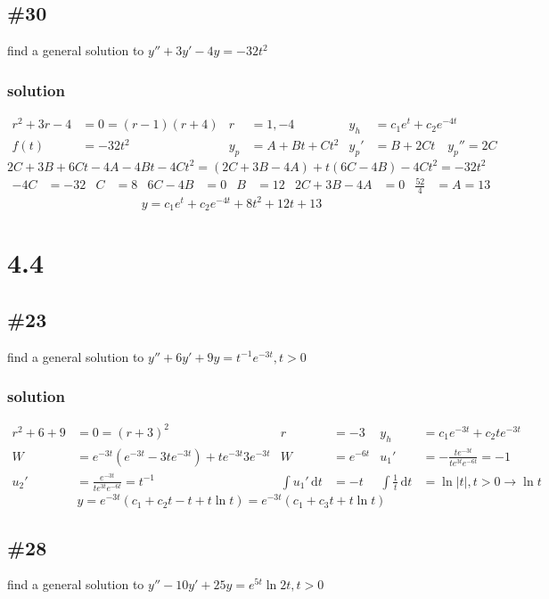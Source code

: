 \documentclass{article}
\newcommand{\abs}[1]{\left\lvert #1 \right\rvert}
\begin{document}
\subsection*{\#30}
find a general solution to $y''+3y'-4y=-32t^2$
\subsubsection*{solution}
\begin{align*}
	r^2+3r-4&=0=(r-1)(r+4) & r&=1,-4 & y_h&=c_1e^t+c_2e^{-4t}\\
	f(t)&=-32t^2 & y_p&=A+Bt+Ct^2 & {y_p}'&=B+2Ct \quad {y_p}''=2C
\end{align*}
\[2C+3B+6Ct-4A-4Bt-4Ct^2=(2C+3B-4A)+t(6C-4B)-4Ct^2=-32t^2\]
\begin{align*}
	-4C&=-32 & C&=8 & 6C-4B&=0 & B&=12 & 2C+3B-4A&=0 & \frac{52}{4}&=A=13
\end{align*}
\[y=c_1e^t+c_2e^{-4t}+8t^2+12t+13\]
\section*{4.4}

\subsection*{\#23}
find a general solution to $y''+6y'+9y=t^{-1}e^{-3t},t>0$
\subsubsection*{solution}
\begin{align*}
	r^2+6+9&=0=(r+3)^2 & r&=-3 & y_h&=c_1e^{-3t}+c_2te^{-3t}\\
	W&=e^{-3t}(e^{-3t}-3te^{-3t})+te^{-3t}3e^{-3t} & W&=e^{-6t} & {u_1}'&=-\frac{te^{-3t}}{te^{3t}e^{-6t}}=-1 \\
	{u_2}'&=\frac{e^{-3t}}{te^{3t}e^{-6t}}=t^{-1} & \int{{u_1}'\,\mathrm{d}t}&=-t & \int{\frac{1}{t}\,\mathrm{d}t}&=\ln{\abs{t}},t>0\rightarrow\ln t
\end{align*}
\[y=e^{-3t}\left(c_1+c_2t-t+t\ln t\right)=e^{-3t}\left(c_1+c_3t+t\ln t\right)\]

\subsection*{\#28}
find a general solution to $y''-10y'+25y=e^{5t}\ln 2t, t>0$
\end{document}
